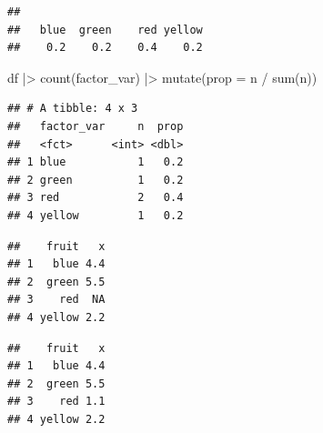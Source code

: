 \documentclass[
  12pt,
  oneside]{book}
\newenvironment{Shaded}{\begin{snugshade}}{\end{snugshade}}
\newcommand{\AttributeTok}[1]{\textcolor[rgb]{0.77,0.63,0.00}{#1}}
\newcommand{\CommentTok}[1]{\textcolor[rgb]{0.56,0.35,0.01}{\textit{#1}}}
\newcommand{\ConstantTok}[1]{\textcolor[rgb]{0.00,0.00,0.00}{#1}}
\newcommand{\FunctionTok}[1]{\textcolor[rgb]{0.00,0.00,0.00}{#1}}
\newcommand{\NormalTok}[1]{#1}
\newcommand{\SpecialCharTok}[1]{\textcolor[rgb]{0.00,0.00,0.00}{#1}}
\theoremstyle{definition}
\theoremstyle{definition}
\theoremstyle{definition}
\theoremstyle{definition}
\theoremstyle{remark}
\begin{document}
\begin{verbatim}
## 
##   blue  green    red yellow 
##    0.2    0.2    0.4    0.2
\end{verbatim}

\begin{Shaded}
\begin{Highlighting}[]
\NormalTok{df }\SpecialCharTok{|\textgreater{}} 
  \FunctionTok{count}\NormalTok{(factor\_var) }\SpecialCharTok{|\textgreater{}} 
  \FunctionTok{mutate}\NormalTok{(}\AttributeTok{prop =}\NormalTok{ n }\SpecialCharTok{/} \FunctionTok{sum}\NormalTok{(n))}
\end{Highlighting}
\end{Shaded}

\begin{verbatim}
## # A tibble: 4 x 3
##   factor_var     n  prop
##   <fct>      <int> <dbl>
## 1 blue           1   0.2
## 2 green          1   0.2
## 3 red            2   0.4
## 4 yellow         1   0.2
\end{verbatim}

\begin{Shaded}
\end{Shaded}

\begin{verbatim}
##    fruit   x
## 1   blue 4.4
## 2  green 5.5
## 3    red  NA
## 4 yellow 2.2
\end{verbatim}

\begin{Shaded}
\end{Shaded}

\begin{verbatim}
##    fruit   x
## 1   blue 4.4
## 2  green 5.5
## 3    red 1.1
## 4 yellow 2.2
\end{verbatim}
\end{document}

